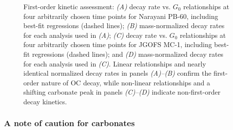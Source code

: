 \begin{figure}[p]
	\caption[Assessment of first-order kinetics]{First-order kinetic assessment: \textit{(A)} decay rate vs. $G_{0}$ relationships at four arbitrarily chosen time points for Narayani PB-60, including best-fit regressions (dashed lines); \textit{(B)} mass-normalized decay rates for each analysis used in \textit{(A)}; \textit{(C)} decay rate vs. $G_{0}$ relationships at four arbitrarily chosen time points for JGOFS MC-1, including best-fit regressions (dashed lines); and \textit{(D)} mass-normalized decay rates for each analysis used in \textit{(C)}. Linear relationships and nearly identical normalized decay rates in panels \textit{(A)--(B)} confirm the first-order nature of OC decay, while non-linear relationships and a shifting carbonate peak in panels \textit{(C)--(D)} indicate non-first-order  decay kinetics.}
	\label{Ch3Fig:4} 
\end{figure}

\subsubsection{A note of caution for carbonates}\label{Ch3Sec:3521}

